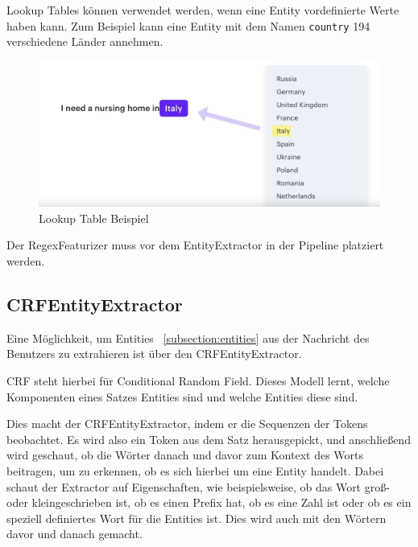 Lookup Tables können verwendet werden, wenn eine Entity vordefinierte Werte haben kann.
Zum Beispiel kann eine Entity mit dem Namen \texttt{country} 194 verschiedene Länder annehmen.\cite{rasaMasterclassRegexFeaturizer, pipelineComponentsYoutube, regexFeaturizerCrf}

\begin{figure}[hbt!]
    \centering
    \includegraphics[scale=0.25]{pics/lookup-table-example}
    \caption{Lookup Table Beispiel~\cite{pipelineComponentsYoutube}}
    \label{fig:Lookup Table Beispiel}
\end{figure}

Der RegexFeaturizer muss vor dem EntityExtractor in der Pipeline platziert werden.\cite{rasaMasterclassRegexFeaturizer, pipelineComponentsYoutube, regexFeaturizerCrf}

\subsection{CRFEntityExtractor}\label{subsec:crfentityextractor}

Eine Möglichkeit, um Entities ~\ref{subsection:entities} aus der Nachricht des Benutzers zu extrahieren ist über den CRFEntityExtractor.\cite{crfEntityExtractor}

CRF steht hierbei für Conditional Random Field.
Dieses Modell lernt, welche Komponenten eines Satzes Entities sind und welche Entities diese sind.\cite{crfEntityExtractor, pipelineComponentsYoutube, regexFeaturizerCrf}

Dies macht der CRFEntityExtractor, indem er die Sequenzen der Tokens beobachtet.
Es wird also ein Token aus dem Satz herausgepickt, und anschließend wird geschaut, ob die Wörter danach und davor zum Kontext des Worts beitragen, um zu erkennen, ob es sich hierbei um eine Entity handelt.
Dabei schaut der Extractor auf Eigenschaften, wie beispielsweise, ob das Wort groß- oder kleingeschrieben ist, ob es einen Prefix hat, ob es eine Zahl ist oder ob es ein speziell definiertes Wort für die Entities ist.
Dies wird auch mit den Wörtern davor und danach gemacht.\cite{crfEntityExtractor, pipelineComponentsYoutube, regexFeaturizerCrf}


